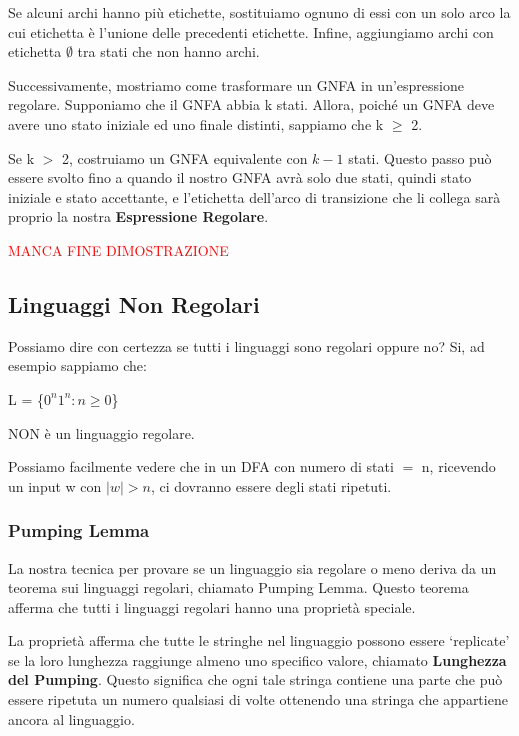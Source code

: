 \documentclass{article}
\begin{document}
Se alcuni archi hanno più etichette, sostituiamo ognuno di essi con un solo arco
la cui etichetta è l'unione delle precedenti etichette. Infine, aggiungiamo
archi con etichetta $\emptyset$ tra stati che non hanno archi. 

Successivamente, mostriamo come trasformare un GNFA in un'espressione regolare.
Supponiamo che il GNFA abbia k stati. Allora, poiché un GNFA deve avere uno
stato iniziale ed uno finale distinti, sappiamo che k $\geq$ 2. 

Se k $>$ 2, costruiamo un GNFA equivalente con $k - 1$ stati. Questo passo può
essere svolto fino a quando il nostro GNFA avrà solo due stati, quindi stato
iniziale e stato accettante, e l'etichetta dell'arco di transizione che li
collega sarà proprio la nostra \textbf{Espressione Regolare}.

\begin{center}
    \textcolor{red}{MANCA FINE DIMOSTRAZIONE}    
\end{center}

\subsection{Linguaggi Non Regolari}
Possiamo dire con certezza se tutti i linguaggi sono regolari oppure no? Si, ad
esempio sappiamo che:

\begin{center}
    L = \{$0^n 1^n : n \geq 0$\}

    NON è un linguaggio regolare.
\end{center}

Possiamo facilmente vedere che in un DFA con numero di stati $=$ n, ricevendo un
input w con $|w| > n$, ci dovranno essere degli stati ripetuti.

\subsubsection{Pumping Lemma}
La nostra tecnica per provare se un linguaggio sia regolare o meno deriva da un
teorema sui linguaggi regolari, chiamato Pumping Lemma. Questo teorema afferma
che tutti i linguaggi regolari hanno una proprietà speciale.

La proprietà afferma che tutte le stringhe nel linguaggio possono essere
`replicate' se la loro lunghezza raggiunge almeno uno specifico valore, chiamato
\textbf{Lunghezza del Pumping}. Questo significa che ogni tale stringa contiene
una parte che può essere ripetuta un numero qualsiasi di volte ottenendo una
stringa che appartiene ancora al linguaggio.
\end{document}
